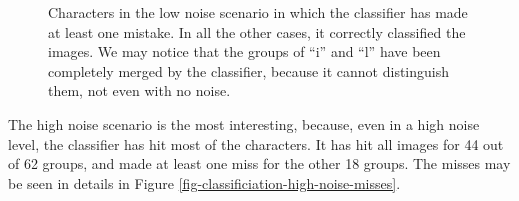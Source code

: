 \begin{figure}[!htb]
  \caption{Characters in the low noise scenario in which the classifier has made at least one mistake. In all the other cases, it correctly classified the images. We may notice that the groups of ``i'' and ``l'' have been completely merged by the classifier, because it cannot distinguish them, not even with no noise.}
  \label{fig-classification-low-noise-results}
\end{figure}

The high noise scenario is the most interesting, because, even in a high noise level, the classifier has hit most of the characters. It has hit all images for 44 out of 62 groups, and made at least one miss for the other 18 groups. The misses may be seen in details in Figure \ref{fig-classificiation-high-noise-misses}.

\begin{figure}[!htb]
  \centering





\end{figure}
